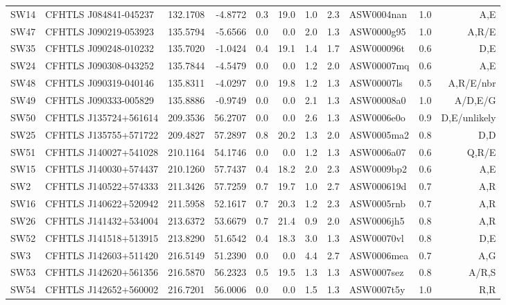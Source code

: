 \documentclass[useAMS,usenatbib,a4paper]{mn2e}
\begin{document}
\begin{center}
\begin{longtable}{llrrrrrrlrr}
SW14 & CFHTLS J084841-045237 &  132.1708 &   -4.8772 &  0.3 & 19.0 &  1.0 &  2.3 & ASW0004nan &  1.0  &  A,E   \\
SW47 & CFHTLS J090219-053923 &  135.5794 &   -5.6566 &  0.0 &  0.0 &  2.0 &  1.3 & ASW0000g95 &  1.0  &  A,R/E   \\
SW35 & CFHTLS J090248-010232 &  135.7020 &   -1.0424 &  0.4 & 19.1 &  1.4 &  1.7 & ASW000096t &  0.6  &  D,E   \\
SW24 & CFHTLS J090308-043252 &  135.7844 &   -4.5479 &  0.0 &  0.0 &  1.2 &  2.0 & ASW00007mq &  0.6  &  A,E   \\
SW48 & CFHTLS J090319-040146 &  135.8311 &   -4.0297 &  0.0 & 19.8 &  1.2 &  1.3 & ASW00007ls &  0.5  &  A,R/E/nbr   \\
SW49 & CFHTLS J090333-005829 &  135.8886 &   -0.9749 &  0.0 &  0.0 &  2.1 &  1.3 & ASW00008a0 &  1.0  &  A/D,E/G   \\
SW50 & CFHTLS J135724+561614 &  209.3536 &   56.2707 &  0.0 &  0.0 &  2.6 &  1.3 & ASW0006e0o &  0.9  &  D,E/unlikely   \\
SW25 & CFHTLS J135755+571722 &  209.4827 &   57.2897 &  0.8 & 20.2 &  1.3 &  2.0 & ASW0005ma2 &  0.8  &  D,D   \\
SW51 & CFHTLS J140027+541028 &  210.1164 &   54.1746 &  0.0 &  0.0 &  1.2 &  1.3 & ASW0006a07 &  0.6  &  Q,R/E   \\
SW15 & CFHTLS J140030+574437 &  210.1260 &   57.7437 &  0.4 & 18.2 &  2.0 &  2.3 & ASW0009bp2 &  0.6  &  A,E   \\
 SW2 & CFHTLS J140522+574333 &  211.3426 &   57.7259 &  0.7 & 19.7 &  1.0 &  2.7 & ASW000619d &  0.7  &  A,R   \\
SW16 & CFHTLS J140622+520942 &  211.5958 &   52.1617 &  0.7 & 20.3 &  1.2 &  2.3 & ASW0005rnb &  0.7  &  A,R   \\
SW26 & CFHTLS J141432+534004 &  213.6372 &   53.6679 &  0.7 & 21.4 &  0.9 &  2.0 & ASW0006jh5 &  0.8  &  A,R   \\
SW52 & CFHTLS J141518+513915 &  213.8290 &   51.6542 &  0.4 & 18.3 &  3.0 &  1.3 & ASW00070vl &  0.8  &  D,E   \\
 SW3 & CFHTLS J142603+511420 &  216.5149 &   51.2390 &  0.0 &  0.0 &  4.4 &  2.7 & ASW0006mea &  0.7  &  A,G   \\
SW53 & CFHTLS J142620+561356 &  216.5870 &   56.2323 &  0.5 & 19.5 &  1.3 &  1.3 & ASW0007sez &  0.8  &  A/R,S   \\
SW54 & CFHTLS J142652+560002 &  216.7201 &   56.0006 &  0.0 &  0.0 &  1.5 &  1.3 & ASW0007t5y &  1.0  &  R,R   \\

\end{longtable}
\end{center}
\end{document}
